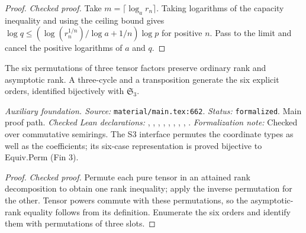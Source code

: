 \begin{proof}
\leanok
\textit{Checked proof.} Take $m=\lceil\log_a r_n\rceil$. Taking logarithms of the capacity inequality and using the ceiling bound gives $\log q\le(\log(r_n^{1/n})/\log a+1/n)\log p$ for positive $n$. Pass to the limit and cancel the positive logarithms of $a$ and $q$.
\end{proof}

\renewcommand{\thetheorem}{A48}
\begin{lemma}
\label{aux:factor-permutations}
\leanok
The six permutations of three tensor factors preserve ordinary rank and asymptotic rank. A three-cycle and a transposition generate the six explicit orders, identified bijectively with $\mathfrak S_3$.
\end{lemma}

\noindent\textit{Auxiliary foundation. Source:} \texttt{material/main.tex:662}.
\textit{Status:} \texttt{formalized}. Main proof path.
\textit{Checked Lean declarations:} , , , , , , , , .
\textit{Formalization note:} Checked over commutative semirings. The S3 interface permutes the coordinate types as well as the coefficients; its six-case representation is proved bijective to Equiv.Perm (Fin 3).

\begin{proof}
\leanok
{}
\textit{Checked proof.} Permute each pure tensor in an attained rank decomposition to obtain one rank inequality; apply the inverse permutation for the other. Tensor powers commute with these permutations, so the asymptotic-rank equality follows from its definition. Enumerate the six orders and identify them with permutations of three slots.
\end{proof}

